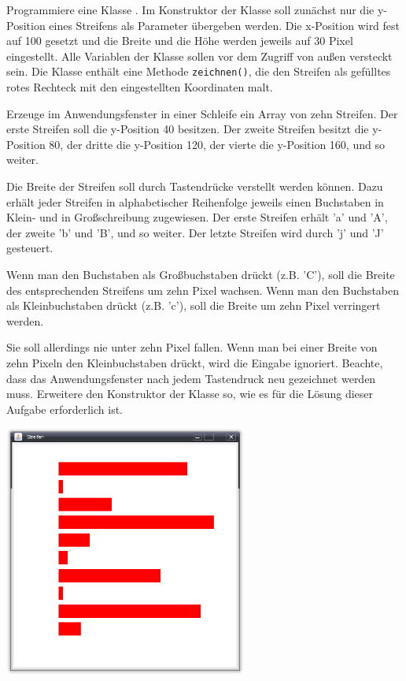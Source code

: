 \begin{compactenum}[a)]
\item Programmiere eine Klasse . Im Konstruktor der Klasse
 soll zunächst nur die y-Position eines Streifens als
Parameter übergeben werden. Die x-Position wird fest auf 100 gesetzt und die
Breite und die Höhe werden jeweils auf 30 Pixel eingestellt. Alle Variablen der
Klasse sollen vor dem Zugriff von außen versteckt sein. Die Klasse
 enthält eine Methode \lstinline|zeichnen()|, die den Streifen
als gefülltes rotes Rechteck mit den eingestellten Koordinaten malt.

Erzeuge im Anwendungsfenster in einer Schleife ein Array von zehn Streifen. Der
erste Streifen soll die y-Position 40 besitzen. Der zweite Streifen besitzt die
y-Position 80, der dritte die y-Position 120, der vierte die y-Position 160,
und so weiter.

\item Die Breite der Streifen soll durch Tastendrücke verstellt werden können.
Dazu erhält jeder Streifen in alphabetischer Reihenfolge jeweils einen
Buchstaben in Klein- und in Großschreibung zugewiesen. Der erste Streifen
erhält ’a’ und ’A’, der zweite ’b’ und ’B’, und so weiter. Der letzte Streifen
wird durch ’j’ und ’J’ gesteuert.

Wenn man den Buchstaben als Großbuchstaben drückt (z.B. ’C’), soll die Breite
des entsprechenden Streifens um zehn Pixel wachsen. Wenn man den Buchstaben als
Kleinbuchstaben drückt (z.B. ’c’), soll die Breite um zehn Pixel verringert
werden.

Sie soll allerdings nie unter zehn Pixel fallen. Wenn man bei einer Breite von
zehn Pixeln den Kleinbuchstaben drückt, wird die Eingabe ignoriert. Beachte,
dass das Anwendungsfenster nach jedem Tastendruck neu gezeichnet werden muss.
Erweitere den Konstruktor der Klasse  so, wie es für die
Lösung dieser Aufgabe erforderlich ist.
\end{compactenum}

\begin{center}
\includegraphics[width=0.6\textwidth]{./inf/SEKII/21_Java_Tastaturereignisse/Streifen.png}
\end{center}
